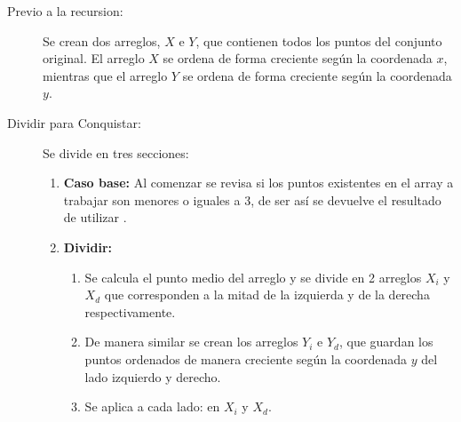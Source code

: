 \documentclass[informe.tex]{subfiles}
\begin{document}
\begin{description}
	\item[Previo a la recursion:]
	      Se crean dos arreglos, $X$ e $Y$, que contienen todos los puntos del conjunto original.
	      El arreglo $X$ se ordena de forma creciente según la coordenada $x$, mientras que el
	      arreglo $Y$ se ordena de forma creciente según la coordenada $y$.

	\item[Dividir para Conquistar:]
	      Se divide en tres secciones:
	      \begin{enumerate}
		      \item \textbf{Caso base:}
		            Al comenzar se revisa si los puntos existentes en el array a trabajar son
		            menores o iguales a 3, de ser así se devuelve el resultado de
		            utilizar .
		      \item \textbf{Dividir:}
		            \begin{enumerate}
			            \item Se calcula el punto medio del arreglo y se divide en 2 arreglos
			                  $X_i$ y $X_d$ que corresponden a la mitad de la izquierda y de la
			                  derecha respectivamente.

			            \item De manera similar se crean los arreglos $Y_i$ e $Y_d$, que guardan
			                  los puntos ordenados de manera creciente según la coordenada $y$ del
			                  lado izquierdo y derecho.

			            \item Se aplica  a cada lado: en $X_i$ y $X_d$.


\end{enumerate}
\end{enumerate}
\end{description}
\end{document}
